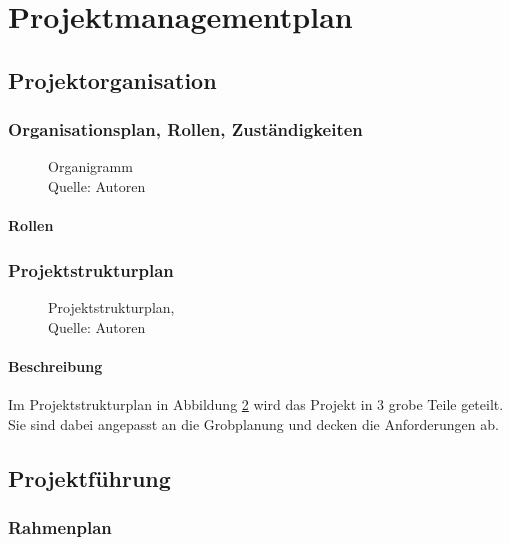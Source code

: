 
\section{Projektmanagementplan}

\subsection{Projektorganisation}
\subsubsection{Organisationsplan, Rollen, Zuständigkeiten}
\begin{figure}[H]
    \centering
    \caption[Organigramm]{Organigramm\\ Quelle: Autoren}
    \label{img: OrganigrammWiPro}
\end{figure}

\paragraph{Rollen}
\subsubsection{Projektstrukturplan}

\begin{figure}[H]
    \centering
    \caption[Projektstrukturplan]{Projektstrukturplan,\\ Quelle: Autoren}
    \label{img: Projektstrukturplan}
\end{figure}

\paragraph{Beschreibung}
Im Projektstrukturplan in Abbildung \ref{img: Projektstrukturplan} wird das Projekt in 3 grobe Teile geteilt. Sie sind dabei angepasst an die Grobplanung und decken die Anforderungen ab. 
\newpage
\subsection{Projektführung}
\subsubsection{Rahmenplan}

